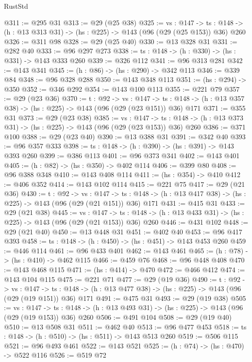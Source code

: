 \begin{lexlean}{RustStd}
\begin{coremodule}
{\begin{coremodule}
{{@311 := @295 @31
@313 := @29 (@25 @38)
@325 := {vs : @147} ->
  {ts : @148} -> (h : @13 @313 @31) -> (hs : @225) -> @143 (@96 (@29 (@25 @153)) @36) @260
@326 := @311 @98
@328 := @29 (@25 @40)
@330 := @13 @328 @31
@331 := @282 @40
@333 := @96 @297 @273
@338 := {ts : @148} -> (h : @330) -> (hs : @331) -> @143 @333 @260
@339 := @326 @112
@341 := @96 @313 @281
@342 := @143 @341
@345 := (h : @86) -> (hs : @290) -> @342 @113
@346 := @339 @84
@348 := @96 @328 @288
@350 := @143 @348 @113
@351 := (hs : @294) -> @350
@352 := @346 @292
@354 := @143 @100 @113
@355 := @221 @79
@357 := @29 (@23 @36)
@370 := {t : @92} ->
  {vs : @147} ->
  {ts : @148} -> (h : @13 @357 @38) -> (hs : @225) -> @143 (@96 (@29 (@23 @151)) @36) @171
@371 := @355 @31
@373 := @29 (@23 @38)
@385 := {vs : @147} ->
  {ts : @148} -> (h : @13 @373 @31) -> (hs : @225) -> @143 (@96 (@29 (@23 @153)) @36) @260
@386 := @371 @100
@388 := @29 (@23 @40)
@390 := @13 @388 @31
@391 := @342 @40
@393 := @96 @357 @333
@398 := {ts : @148} -> (h : @390) -> (hs : @391) -> @143 @393 @260
@399 := @386 @113
@401 := @96 @373 @341
@402 := @143 @401
@405 := (h : @82) -> (hs : @350) -> @402 @114
@406 := @399 @80
@408 := @96 @388 @348
@410 := @143 @408 @114
@411 := (hs : @354) -> @410
@412 := @406 @352
@414 := @143 @102 @114
@415 := @221 @75
@417 := @29 (@21 @36)
@430 := {t : @92} ->
  {vs : @147} ->
  {ts : @148} -> (h : @13 @417 @38) -> (hs : @225) -> @143 (@96 (@29 (@21 @151)) @36) @171
@431 := @415 @31
@433 := @29 (@21 @38)
@445 := {vs : @147} ->
  {ts : @148} -> (h : @13 @433 @31) -> (hs : @225) -> @143 (@96 (@29 (@21 @153)) @36) @260
@446 := @431 @102
@448 := @29 (@21 @40)
@450 := @13 @448 @31
@451 := @402 @40
@453 := @96 @417 @393
@458 := {ts : @148} -> (h : @450) -> (hs : @451) -> @143 @453 @260
@459 := @446 @114
@461 := @96 @433 @401
@462 := @143 @461
@465 := (h : @78) -> (hs : @410) -> @462 @115
@466 := @459 @76
@468 := @96 @448 @408
@470 := @143 @468 @115
@471 := (hs : @414) -> @470
@472 := @466 @412
@474 := @143 @104 @115
@475 := @221 @71
@477 := @29 (@19 @36)
@490 := {t : @92} ->
  {vs : @147} ->
  {ts : @148} -> (h : @13 @477 @38) -> (hs : @225) -> @143 (@96 (@29 (@19 @151)) @36) @171
@491 := @475 @31
@493 := @29 (@19 @38)
@505 := {vs : @147} ->
  {ts : @148} -> (h : @13 @493 @31) -> (hs : @225) -> @143 (@96 (@29 (@19 @153)) @36) @260
@506 := @491 @104
@508 := @29 (@19 @40)
@510 := @13 @508 @31
@511 := @462 @40
@513 := @96 @477 @453
@518 := {ts : @148} -> (h : @510) -> (hs : @511) -> @143 @513 @260
@519 := @506 @115
@521 := @96 @493 @461
@522 := @143 @521
@525 := (h : @74) -> (hs : @470) -> @522 @116
@526 := @519 @72
}}
\end{coremodule}}
\end{coremodule}
\end{lexlean}
